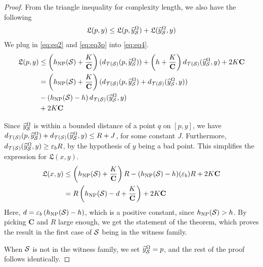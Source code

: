 \begin{proof}
From the triangle inequality for complexity length, we also have the following
\begin{align}
  \label{eq:eq4}
  \mathfrak{L}(p, y) \leq \mathfrak{L}(p, \widehat{y}_{\mathcal{S}}^{\Omega}) + \mathfrak{L}(\widehat{y}_{\mathcal{S}}^{\Omega}, y)
\end{align}
We plug in \eqref{eq:eq2} and \eqref{eq:eq3p} into \eqref{eq:eq4}.
\begin{align*}
  \mathfrak{L}(p, y) &\leq \left( h_{\mathrm{NP}}(\mathcal{S}) + \frac{K}{\mathbf{C}} \right) (d_{\mathcal{T}(\mathcal{S})}(p, \widehat{y}_{\mathcal{S}}^{\Omega})) + \left( h + \frac{K}{\mathbf{C}} \right) d_{\mathcal{T}(\mathcal{S})}(\widehat{y}_{\mathcal{S}}^{\Omega}, y) +  2K \mathbf{C} \\
                     &= \left( h_{\mathrm{NP}}(\mathcal{S}) + \frac{K}{\mathbf{C}} \right) (d_{\mathcal{T}(\mathcal{S})}(p, \widehat{y}_{\mathcal{S}}^{\Omega}) + d_{\mathcal{T}(\mathcal{S})}(\widehat{y}_{\mathcal{S}}^{\Omega}, y)) \\
                     &- \left( h_{\mathrm{NP}}(\mathcal{S}) - h \right) d_{\mathcal{T}(\mathcal{S})}(\widehat{y}_{\mathcal{S}}^{\Omega}, y) \\
  &+  2K \mathbf{C}
\end{align*}

Since $\widehat{y}_{\mathcal{S}}^\Omega$ is within a bounded distance of a point $q$ on $[p, y]$, we have $d_{\mathcal{T}(\mathcal{S})}(p, \widehat{y}_{\mathcal{S}}^{\Omega}) + d_{\mathcal{T}(\mathcal{S})}(\widehat{y}_{\mathcal{S}}^{\Omega}, y) \leq R + J$, for some constant $J$.
Furthermore, $d_{\mathcal{T}(\mathcal{S})}(\widehat{y}_{\mathcal{S}}^{\Omega}, y) \geq \varepsilon_b R$, by the hypothesis of $y$ being a bad point.
This simplifies the expression for $\mathfrak{L}(x,y)$.
\begin{align*}
  \mathfrak{L}(x,y) &\leq \left( h_{\mathrm{NP}}(\mathcal{S}) + \frac{K}{\mathbf{C}} \right) R - (h_{\mathrm{NP}}(\mathcal{S}) - h)(\varepsilon_b) R + 2K \mathbf{C} \\
  &= R \left( h_{\mathrm{NP}}(\mathcal{S}) - d + \frac{K}{\mathbf{C}} \right) + 2K\mathbf{C}
\end{align*}
Here, $d = \varepsilon_b \left( h_{\mathrm{NP}}(\mathcal{S}) - h \right)$, which is a positive constant, since $h_{\mathrm{NP}}(\mathcal{S}) > h$.
By picking $\mathbf{C}$ and $R$ large enough, we get the statement of the theorem, which proves the result in the first case of $\mathcal{S}$ being in the witness family.

When $\mathcal{S}$ is not in the witness family, we set $\widehat{y}_{\mathcal{S}}^{\Omega} = p$, and the rest of the proof follows identically.
\end{proof}


